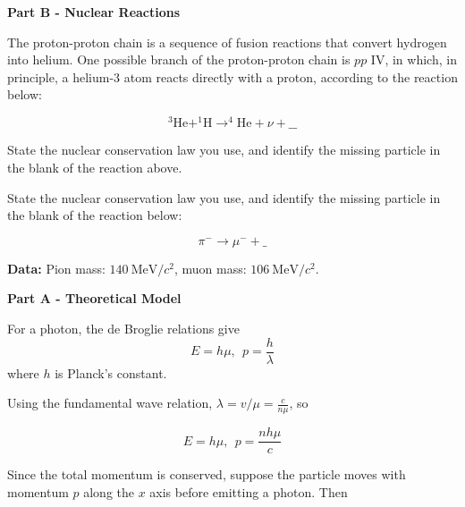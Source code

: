 \documentclass[11pt]{article}
\begin{document}
\begin{pproblem}
\begin{alternativas}
    \begin{center}
        \textbf{Part B - Nuclear Reactions}    
    \end{center}
    
    The proton-proton chain is a sequence of fusion reactions that convert hydrogen into helium.
    One possible branch of the proton-proton chain is $pp \text{ IV}$, in which, in principle, a
    helium-3 atom reacts directly with a proton, according to the reaction below:

    \begin{equation}
        ^3\text{He} + ^1\text{H} \rightarrow ^4\text{He} + \nu + \_\_
    \end{equation}

        \item  State the nuclear conservation law you use, and identify the missing particle
        in the blank of the reaction above.

        \item  State the nuclear conservation law you use, and identify the missing particle
        in the blank of the reaction below:

        \begin{equation}
            \pi^- \rightarrow \mu^- + \_
        \end{equation}
        
        \textbf{Data:} Pion mass: $140 \ \text{MeV}/c^2$, muon mass: $106 \ \text{MeV}/c^2$.
    \end{alternativas}

\begin{pssolution*}{}{}
    \begin{center}
        \textbf{Part A - Theoretical Model}    
    \end{center}

    \begin{alternativas}
        \item For a photon, the de Broglie relations give
        \[E = h\mu, \ \ p = \frac{h}{\lambda}\]
        where \(h\) is Planck's constant.

        Using the fundamental wave relation, \(\lambda = v/\mu = \frac{c}{n\mu}\), so

        \[\boxed{E = h\mu, \ \ p = \frac{nh\mu}{c}}\]

        \item Since the total momentum is conserved, suppose the particle moves with momentum \(p\) along the \(x\) axis before emitting a photon. Then
        

\end{alternativas}
\end{pssolution*}
\end{pproblem}
\end{document}
